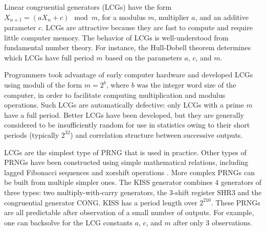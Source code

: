 \documentclass[graybox]{svmult}
\newcommand{\todo}[1]{{\color{red}{TO DO: \sc #1}}}
\begin{document}
Linear congruential generators (LCGs) have the form $X_{n+1} = (a X_n + c) \mod m$, for a modulus $m$, 
multiplier $a$, and an additive parameter $c$.
LCGs are attractive because they are fast to compute and require little computer memory.
The behavior of LCGs is well-understood from fundamental number theory.
For instance, the Hull-Dobell theorem determines which LCGs have full period $m$ based on the parameters $a$, $c$, and $m$.
%

Programmers took advantage of early computer hardware and developed LCGs using moduli of the form $m = 2^b$, where
$b$ was the integer word size of the computer, in order to facilitate computing multiplication and modulus operations.
Such LCGs are automatically defective: only LCGs with a prime $m$ have a full period.
Better LCGs have been developed, but they are generally considered to be insufficiently random for use in statistics owing to their short periods (typically $2^{32}$) and correlation structure between successive outputs.

LCGs are the simplest type of PRNG that is used in practice.
Other types of PRNGs have been constructed using simple mathematical relations,
including lagged Fibonacci sequences and xorshift operations \todo{CITE}.
More complex PRNGs can be built from multiple simpler ones.
The KISS generator combines 4 generators of three types: two multiply-with-carry
generators, the 3-shift register SHR3 and the congruential generator CONG.
KISS has a period length over $2^{210}$.
These PRNGs are all predictable after observation of a small number of outputs.
For example, one can backsolve for the LCG constants $a$, $c$, and $m$ after only 3 observations.
\end{document}
